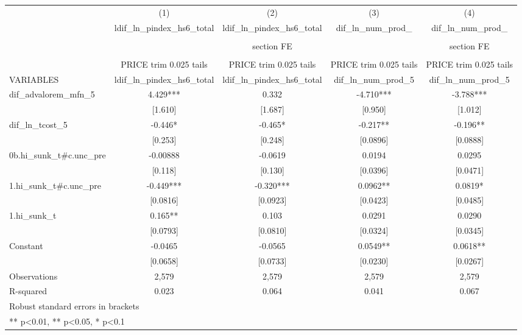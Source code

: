 \begin{tabular}{lcccc}
\toprule
 & (1) & (2) & (3) & (4) \\
 & ldif\_ln\_pindex\_hs6\_total & ldif\_ln\_pindex\_hs6\_total & dif\_ln\_num\_prod\_ & dif\_ln\_num\_prod\_ \\
 &  &  &  &  \\
 &  & section FE &  & section FE \\
 &  &  &  &  \\
 & PRICE trim 0.025 tails & PRICE trim 0.025 tails & PRICE trim 0.025 tails & PRICE trim 0.025 tails \\
VARIABLES & ldif\_ln\_pindex\_hs6\_total & ldif\_ln\_pindex\_hs6\_total & dif\_ln\_num\_prod\_5 & dif\_ln\_num\_prod\_5 \\
\midrule
dif\_advalorem\_mfn\_5 & 4.429*** & 0.332 & -4.710*** & -3.788*** \\
 & [1.610] & [1.687] & [0.950] & [1.012] \\
dif\_ln\_tcost\_5 & -0.446* & -0.465* & -0.217** & -0.196** \\
 & [0.253] & [0.248] & [0.0896] & [0.0888] \\
0b.hi\_sunk\_t\#c.unc\_pre & -0.00888 & -0.0619 & 0.0194 & 0.0295 \\
 & [0.118] & [0.130] & [0.0396] & [0.0471] \\
1.hi\_sunk\_t\#c.unc\_pre & -0.449*** & -0.320*** & 0.0962** & 0.0819* \\
 & [0.0816] & [0.0923] & [0.0423] & [0.0485] \\
1.hi\_sunk\_t & 0.165** & 0.103 & 0.0291 & 0.0290 \\
 & [0.0793] & [0.0810] & [0.0324] & [0.0345] \\
Constant & -0.0465 & -0.0565 & 0.0549** & 0.0618** \\
 & [0.0658] & [0.0733] & [0.0230] & [0.0267] \\
\midrule
Observations & 2,579 & 2,579 & 2,579 & 2,579 \\
R-squared & 0.023 & 0.064 & 0.041 & 0.067 \\
\bottomrule
\multicolumn{5}{l}{\footnotesize Robust standard errors in brackets} \\
\multicolumn{5}{l}{\footnotesize *** p<0.01, ** p<0.05, * p<0.1} \\
\end{tabular}
